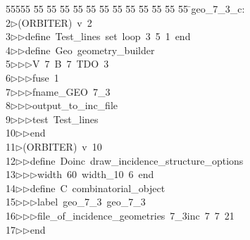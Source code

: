 %
%
\begin{tabbing}
55555 \= 55 \= 55 \= 55 \= 55 \= 55 \= 55 \= 55 \= 55 \= 55 \= 55 \= 55 \= 55 \= \>geo\_7\_3\_c:\\[0pt]
2\>$\triangleright$\>(ORBITER)\ v\ 2\ \\[0pt]
3\>$\triangleright$\>$\triangleright$\>define\ Test\_lines\ set\ loop\ 3\ 5\ 1\ end\ \\[0pt]
4\>$\triangleright$\>$\triangleright$\>define\ Geo\ geometry\_builder\ \\[0pt]
5\>$\triangleright$\>$\triangleright$\>$\triangleright$\>V\ 7\ B\ 7\ TDO\ 3\ \\[0pt]
6\>$\triangleright$\>$\triangleright$\>$\triangleright$\>fuse\ 1\ \\[0pt]
7\>$\triangleright$\>$\triangleright$\>$\triangleright$\>fname\_GEO\ 7\_3\ \\[0pt]
8\>$\triangleright$\>$\triangleright$\>$\triangleright$\>output\_to\_inc\_file\ \\[0pt]
9\>$\triangleright$\>$\triangleright$\>$\triangleright$\>test\ Test\_lines\ \\[0pt]
10\>$\triangleright$\>$\triangleright$\>end\\[0pt]
11\>$\triangleright$\>(ORBITER)\ v\ 10\ \\[0pt]
12\>$\triangleright$\>$\triangleright$\>define\ Doinc\ draw\_incidence\_structure\_options\ \\[0pt]
13\>$\triangleright$\>$\triangleright$\>$\triangleright$\>width\ 60\ width\_10\ 6\ end\ \\[0pt]
14\>$\triangleright$\>$\triangleright$\>define\ C\ combinatorial\_object\ \\[0pt]
15\>$\triangleright$\>$\triangleright$\>$\triangleright$\>label\ geo\_7\_3\ geo\_7\_3\ \\[0pt]
16\>$\triangleright$\>$\triangleright$\>$\triangleright$\>file\_of\_incidence\_geometries\ 7\_3inc\ 7\ 7\ 21\ \\[0pt]
17\>$\triangleright$\>$\triangleright$\>end\ \\[0pt]

\end{tabbing}
